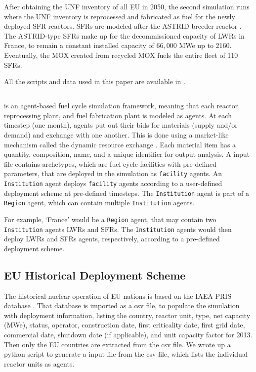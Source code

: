 After obtaining the \gls{UNF} inventory of all \gls{EU} in 2050, the second
simulation runs where the \gls{UNF} inventory is reprocessed and fabricated
as fuel for the newly deployed \gls{SFR} reactors.
\glspl{SFR} are modeled after the ASTRID breeder reactor \cite{varaine_pre-conceptual_2012}.
The ASTRID-type \glspl{SFR} make up for the decommissioned capacity
of \glspl{LWR} in France, to remain a constant installed capacity of $66,000$ MWe up to 2160.
Eventually, the  \gls{MOX} created from recycled \gls{MOX}
fuels the entire fleet of 110 \glspl{SFR}.

All the scripts and data used
in this paper are available in \cite{bae_arfc/transition-scenarios:_2017}.

\subsection{\Cyclus}
\Cyclus is an agent-based fuel cycle simulation framework, meaning that
each reactor, reprocessing plant, and fuel fabrication plant is modeled as agents. At each timestep (one month),
agents put out their bids for materials (supply and/or demand) and exchange
with one another. This is done using a market-like mechanism called the 
dynamic resource exchange \cite{gidden_agent-based_2015}.
Each material item has a quantity, composition, name, and a unique identifier
for output analysis. 
A \Cyclus input file contains archetypes, which are fuel cycle facilities with
pre-defined parameters, that are deployed in the simulation as \texttt{facility} agents.
An \texttt{Institution} agent deploys \texttt{facility} agents
according to a user-defined deployment scheme at pre-defined timesteps.
The \texttt{Institution} agent is part of a \texttt{Region} agent,
which can contain multiple \texttt{Institution} agents.

For example, `France' would be a \texttt{Region} agent,
that may contain two \texttt{Institution} agents \glspl{LWR}
and \glspl{SFR}. The \texttt{Institution} agents would then deploy
\glspl{LWR} and \glspl{SFR} agents, respectively, according to a pre-defined deployment
scheme.


\subsection{\gls{EU} Historical Deployment Scheme}

The historical nuclear operation of \gls{EU} nations is based on
the \gls{IAEA} \gls{PRIS} database \cite{iaea_nuclear_2017}. That database is imported as a csv file, to populate the simulation
with deployment information, listing the country, reactor unit, type, net capacity (MWe), status,
operator, construction date, first criticality date, first grid date, commercial date, shutdown
date (if applicable), and unit capacity factor for 2013. Then only the \gls{EU} countries are extracted
from the csv file. We wrote up a python script to generate a \Cyclus input file from the csv file,
which lists the individual reactor units as agents. 

